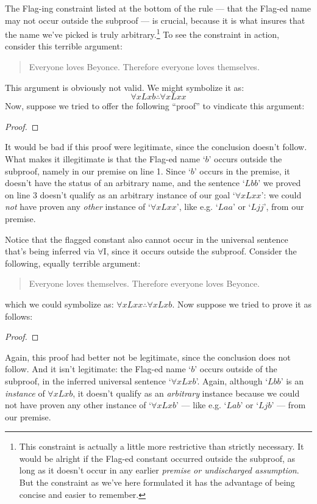 The Flag-ing constraint listed at the bottom of the rule --- that the Flag-ed name may not occur outside the subproof --- is crucial, because it is what insures that the name we've picked is truly arbitrary.\footnote{This constraint is actually a little more restrictive than strictly necessary.  It would be alright if the Flag-ed constant occurred outside the subproof, as long as it doesn't occur in any earlier \emph{premise or undischarged assumption}. But the constraint as we've here formulated it has the advantage of being concise and easier to remember.}  To see the constraint in action, consider this terrible argument:
	\begin{quote}
		Everyone loves Beyonce.  Therefore everyone loves themselves.
	\end{quote}
This argument is obviously not valid.  We might symbolize it as:
$$\forall x Lxb \therefore \forall x Lxx$$
Now, suppose we tried to offer the following ``proof'' to vindicate this argument:
\begin{proof}
	 
	\open
	 \fl{}
	 
	\close
	 
\end{proof}\noindent
It would be bad if this proof were legitimate, since the conclusion doesn't follow.  What makes it illegitimate is that the Flag-ed name `$b$' occurs outside the subproof, namely in our premise on line 1. Since `$b$' occurs in the premise, it doesn't have the status of an arbitrary name, and the sentence `$Lbb$' we proved on line 3 doesn't qualify as an arbitrary instance of our goal `$\forall xLxx$': we could \emph{not} have proven any \emph{other} instance of `$\forall xLxx$', like e.g. `$Laa$' or `$Ljj$', from our premise.

Notice that the flagged constant also cannot occur in the universal sentence that's being inferred via $\forall$I, since it occurs outside the subproof.  Consider the following, equally terrible argument:

	\begin{quote}
		Everyone loves themselves.  Therefore everyone loves Beyonce.
\end{quote}
which we could symbolize as: $\forall xLxx \therefore \forall xLxb$.  Now suppose we tried to prove it as follows:
\begin{proof}
	 
	\open
	 \fl{}
	 
	\close
	 
\end{proof}\noindent
Again, this proof had better not be legitimate, since the conclusion does not follow.  And it isn't legitimate: the Flag-ed name `$b$' occurs outside of the subproof, in the inferred universal sentence `$\forall x Lxb$'.  Again, although `$Lbb$' is an \emph{instance} of $\forall xLxb$, it doesn't qualify as an \emph{arbitrary} instance because we could not have proven any other instance of `$\forall xLxb$' --- like e.g. `$Lab$' or `$Ljb$' --- from our premise.

